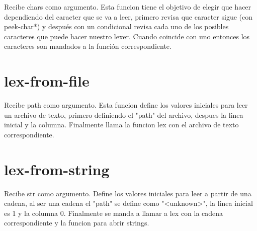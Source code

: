\documentclass{article}
\begin{document}
Recibe chars como argumento. Esta funcion tiene el objetivo de elegir que hacer dependiendo del caracter que se va a leer, primero revisa que caracter sigue (con peek-char*) y después con un condicional revisa cada uno de los posibles caracteres que puede hacer nuestro lexer. Cuando coincide con uno entonces los caracteres son mandados a la función correspondiente.

\section{lex-from-file}

Recibe path como argumento. Esta funcion define los valores iniciales para leer un archivo de texto, primero definiendo el "path" del archivo, despues la linea inicial y la columna. Finalmente llama la funcion lex con el archivo de texto correspondiente.

\section{lex-from-string}

Recibe str como argumento. Define los valores iniciales para leer a partir de una cadena, al ser una cadena el "path" se define como "<unknown>", la linea inicial es 1 y la columna 0. Finalmente se manda a llamar a lex con la cadena correspondiente y la funcion para abrir strings.
\end{document}
